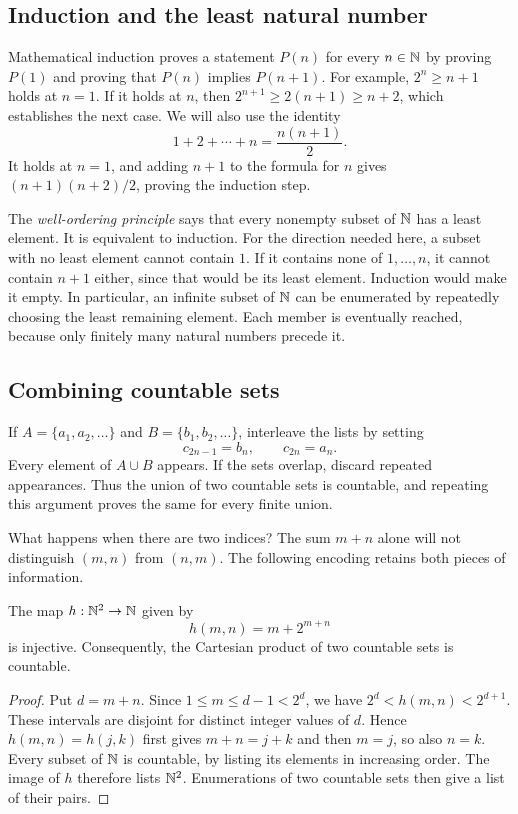 \subsection{Induction and the least natural number}
Mathematical induction proves a statement $P(n)$ for every $n\in\mathbb{N}$ by
proving $P(1)$ and proving that $P(n)$ implies $P(n+1)$.
For example, $2^n\geq n+1$ holds at $n=1$. If it holds at $n$, then
$2^{n+1}\geq2(n+1)\geq n+2$, which establishes the next case.
We will also use the identity
\[
  1+2+\cdots+n=\frac{n(n+1)}{2}.
\]
It holds at $n=1$, and adding $n+1$ to the formula for $n$ gives
$(n+1)(n+2)/2$, proving the induction step.

The \emph{well-ordering principle} says that every nonempty subset of
$\mathbb{N}$ has a least element. It is equivalent to induction. For the direction
needed here, a subset with no least element cannot contain $1$.
If it contains none of $1,\ldots,n$, it cannot contain $n+1$ either,
since that would be its least element. Induction would make it empty.
In particular, an infinite subset of $\mathbb{N}$ can be enumerated by repeatedly
choosing the least remaining element. Each member is eventually reached,
because only finitely many natural numbers precede it.

\subsection{Combining countable sets}
If $A=\{a_1,a_2,\ldots\}$ and $B=\{b_1,b_2,\ldots\}$, interleave the lists
by setting
\[
  c_{2n-1}=b_n,\qquad c_{2n}=a_n.
\]
Every element of $A\cup B$ appears. If the sets overlap, discard repeated
appearances. Thus the union of two countable sets is countable, and
repeating this argument proves the same for every finite union.

What happens when there are two indices? The sum $m+n$ alone will not
distinguish $(m,n)$ from $(n,m)$. The following encoding retains both pieces
of information.

\begin{proposition}
  The map $h:\mathbb{N}^2\to\mathbb{N}$ given by
  \[
    h(m,n)=m+2^{m+n}
  \]
  is injective. Consequently, the Cartesian product of two countable sets
  is countable.
\end{proposition}
\begin{proof}
  Put $d=m+n$. Since $1\leq m\leq d-1<2^d$, we have
  $2^d<h(m,n)<2^{d+1}$. These intervals are disjoint for distinct integer
  values of $d$. Hence $h(m,n)=h(j,k)$ first gives $m+n=j+k$ and then
  $m=j$, so also $n=k$. Every subset of $\mathbb{N}$ is countable, by listing its
  elements in increasing order. The image of $h$ therefore lists $\mathbb{N}^2$.
  Enumerations of two countable sets then give a list of their pairs.
\end{proof}

